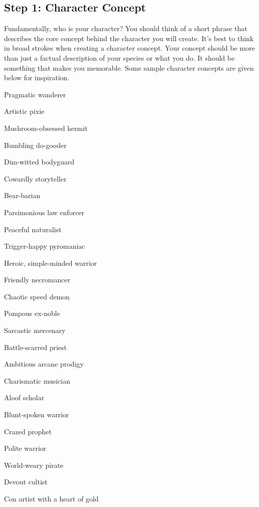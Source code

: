   \subsection{Step 1: Character Concept}

    Fundamentally, who is your character?
    You should think of a short phrase that describes the core concept behind the character you will create.
    It's best to think in broad strokes when creating a character concept.
    Your concept should be more than just a factual description of your species or what you do.
    It should be something that makes you memorable.
    Some sample character concepts are given below for inspiration.

    \begin{raggeditemize}
      \item Pragmatic wanderer
      \item Artistic pixie
      \item Mushroom-obsessed hermit
      \item Bumbling do-gooder
      \item Dim-witted bodyguard
      \item Cowardly storyteller
      \item Bear-barian
      \item Parsimonious law enforcer
      \item Peaceful naturalist
      \item Trigger-happy pyromaniac
      \item Heroic, simple-minded warrior
      \item Friendly necromancer
      \item Chaotic speed demon
      \item Pompous ex-noble
      \item Sarcastic mercenary
      \item Battle-scarred priest
      \item Ambitious arcane prodigy
      \item Charismatic musician
      \item Aloof scholar
      \item Blunt-spoken warrior
      \item Crazed prophet
      \item Polite warrior
      \item World-weary pirate
      \item Devout cultist
      \item Con artist with a heart of gold
    \end{raggeditemize}

